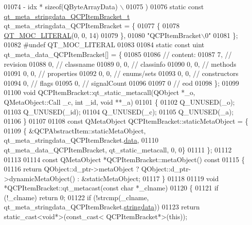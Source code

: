 \begin{DoxyCode}
01074 \textcolor{preprocessor}{        - idx * sizeof(QByteArrayData) \(\backslash\)}
01075 \textcolor{preprocessor}{    )}
01076 \textcolor{keyword}{static} \textcolor{keyword}{const} \hyperlink{a00016_d3/d32/a00105}{qt\_meta\_stringdata\_QCPItemBracket\_t} 
      qt\_meta\_stringdata\_QCPItemBracket = \{
01077     \{
01078 \hyperlink{a00016_a75bb9482d242cde0a06c9dbdc6b83abe}{QT\_MOC\_LITERAL}(0, 0, 14)
01079     \},
01080     \textcolor{stringliteral}{"QCPItemBracket\(\backslash\)0"}
01081 \};
01082 \textcolor{preprocessor}{#undef QT\_MOC\_LITERAL}
01083 
01084 \textcolor{keyword}{static} \textcolor{keyword}{const} uint qt\_meta\_data\_QCPItemBracket[] = \{
01085 
01086  \textcolor{comment}{// content:}
01087        7,       \textcolor{comment}{// revision}
01088        0,       \textcolor{comment}{// classname}
01089        0,    0, \textcolor{comment}{// classinfo}
01090        0,    0, \textcolor{comment}{// methods}
01091        0,    0, \textcolor{comment}{// properties}
01092        0,    0, \textcolor{comment}{// enums/sets}
01093        0,    0, \textcolor{comment}{// constructors}
01094        0,       \textcolor{comment}{// flags}
01095        0,       \textcolor{comment}{// signalCount}
01096 
01097        0        \textcolor{comment}{// eod}
01098 \};
01099 
01100 \textcolor{keywordtype}{void} QCPItemBracket::qt\_static\_metacall(QObject *\_o, QMetaObject::Call \_c, \textcolor{keywordtype}{int} \_id, \textcolor{keywordtype}{void} **\_a)
01101 \{
01102     Q\_UNUSED(\_o);
01103     Q\_UNUSED(\_id);
01104     Q\_UNUSED(\_c);
01105     Q\_UNUSED(\_a);
01106 \}
01107 
01108 \textcolor{keyword}{const} QMetaObject QCPItemBracket::staticMetaObject = \{
01109     \{ &QCPAbstractItem::staticMetaObject, qt\_meta\_stringdata\_QCPItemBracket.\hyperlink{a00016_a15ff7a0bed3ecf746215a57a076c296b}{data},
01110       qt\_meta\_data\_QCPItemBracket,  qt\_static\_metacall, 0, 0\}
01111 \};
01112 
01113 
01114 \textcolor{keyword}{const} QMetaObject *QCPItemBracket::metaObject()\textcolor{keyword}{ const}
01115 \textcolor{keyword}{}\{
01116     \textcolor{keywordflow}{return} QObject::d\_ptr->metaObject ? QObject::d\_ptr->dynamicMetaObject() : &staticMetaObject;
01117 \}
01118 
01119 \textcolor{keywordtype}{void} *QCPItemBracket::qt\_metacast(\textcolor{keyword}{const} \textcolor{keywordtype}{char} *\_clname)
01120 \{
01121     \textcolor{keywordflow}{if} (!\_clname) \textcolor{keywordflow}{return} 0;
01122     \textcolor{keywordflow}{if} (!strcmp(\_clname, qt\_meta\_stringdata\_QCPItemBracket.\hyperlink{a00016_a2e0cf4afc3bc921fbe6f35930bfbd9af}{stringdata}))
01123         \textcolor{keywordflow}{return} \textcolor{keyword}{static\_cast<}\textcolor{keywordtype}{void}*\textcolor{keyword}{>}(\textcolor{keyword}{const\_cast<} QCPItemBracket*\textcolor{keyword}{>}(\textcolor{keyword}{this}));

\end{DoxyCode}
